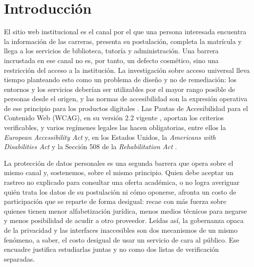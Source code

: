 \documentclass[pdflatex,sn-basic,Numbered]{sn-jnl}
\theoremstyle{thmstyleone}
\theoremstyle{thmstyletwo}
\theoremstyle{thmstylethree}
\begin{document}

\maketitle

\section{Introducci\'on}\label{sec:introduction}

El sitio web institucional es el canal por el que una persona interesada encuentra la informaci\'on de las carreras, presenta su postulaci\'on, completa la matr\'icula y llega a los servicios de biblioteca, tutor\'ia y administraci\'on. Una barrera incrustada en ese canal no es, por tanto, un defecto cosm\'etico, sino una restricci\'on del acceso a la instituci\'on. La investigaci\'on sobre acceso universal lleva tiempo planteando esto como un problema de dise\~no y no de remediaci\'on: los entornos y los servicios deber\'ian ser utilizables por el mayor rango posible de personas desde el origen, y las normas de accesibilidad son la expresi\'on operativa de ese principio para los productos digitales \citep{hermosaramirez2025universal}. Las Pautas de Accesibilidad para el Contenido Web (WCAG), en su versi\'on 2.2 vigente \citep{wcag22}, aportan los criterios verificables, y varios reg\'imenes legales las hacen obligatorias, entre ellos la \emph{European Accessibility Act} \citep{eaa2019} y, en los Estados Unidos, la \emph{Americans with Disabilities Act} y la Secci\'on 508 de la \emph{Rehabilitation Act} \citep{ada1990,section508}.

La protecci\'on de datos personales es una segunda barrera que opera sobre el mismo canal y, sostenemos, sobre el mismo principio. Quien debe aceptar un rastreo no explicado para consultar una oferta acad\'emica, o no logra averiguar qui\'en trata los datos de su postulaci\'on ni c\'omo oponerse, afronta un costo de participaci\'on que se reparte de forma desigual: recae con m\'as fuerza sobre quienes tienen menor alfabetizaci\'on jur\'idica, menos medios t\'ecnicos para negarse y menos posibilidad de acudir a otro proveedor. Le\'idas as\'i, la gobernanza opaca de la privacidad y las interfaces inaccesibles son dos mecanismos de un mismo fen\'omeno, a saber, el costo desigual de usar un servicio de cara al p\'ublico. Ese encuadre justifica estudiarlas juntas y no como dos listas de verificaci\'on separadas.
\end{document}
